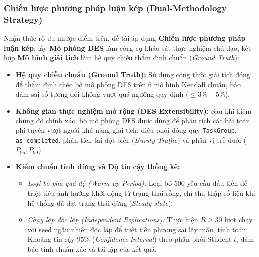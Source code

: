 \subsubsection{Chiến lược phương pháp luận kép (Dual-Methodology Strategy)}
\hspace{0.5cm}Nhận thức rõ ưu nhược điểm trên, đề tài áp dụng \textbf{Chiến lược phương pháp luận kép}: lấy \textbf{Mô phỏng DES} làm công cụ khảo sát thực nghiệm chủ đạo, kết hợp \textbf{Mô hình giải tích} làm hệ quy chiếu thẩm định chuẩn (\textit{Ground Truth}):
\begin{itemize}[leftmargin=1.5em, itemsep=2.5pt]
    \item \textbf{Hệ quy chiếu chuẩn (Ground Truth):} Sử dụng công thức giải tích đóng để thẩm định chéo bộ mô phỏng DES trên 6 mô hình Kendall chuẩn, bảo đảm sai số tương đối không vượt quá ngưỡng quy định ($\le 3\% - 5\%$).
    \item \textbf{Không gian thực nghiệm mở rộng (DES Extensibility):} Sau khi kiểm chứng độ chính xác, bộ mô phỏng DES được dùng để phân tích các bài toán phi tuyến vượt ngoài khả năng giải tích: điều phối đồng quy \texttt{TaskGroup}, \texttt{as\_completed}, phân tích tải đột biến (\textit{Bursty Traffic}) và phân vị trễ đuôi ($P_{95}, P_{99}$).
    \item \textbf{Kiểm chuẩn tính dừng và Độ tin cậy thống kê:}
    \begin{itemize}[leftmargin=1.2em, itemsep=1.5pt]
        \item \textit{Loại bỏ pha quá độ (Warm-up Period):} Loại bỏ 500 yêu cầu đầu tiên để triệt tiêu ảnh hưởng khởi động từ trạng thái rỗng, chỉ thu thập số liệu khi hệ thống đã đạt trạng thái dừng (\textit{Steady-state}).
        \item \textit{Chạy lặp độc lập (Independent Replications):} Thực hiện $R \ge 30$ lượt chạy với seed ngẫu nhiên độc lập để triệt tiêu phương sai lấy mẫu, tính toán Khoảng tin cậy 95\% (\textit{Confidence Interval}) theo phân phối Student-$t$, đảm bảo tính chuẩn xác và tái lập của kết quả.
    \end{itemize}
\end{itemize}
